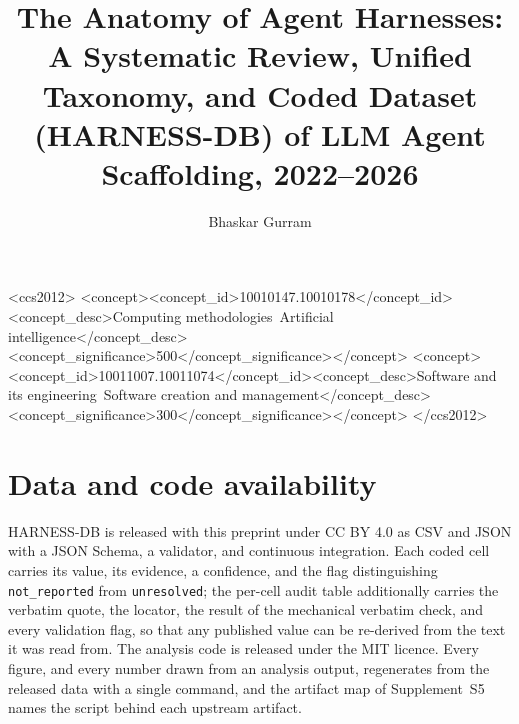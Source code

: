 \documentclass[manuscript,screen,review]{acmart}
\title{The Anatomy of Agent Harnesses: A Systematic Review, Unified Taxonomy, and Coded Dataset (HARNESS-DB) of LLM Agent Scaffolding, 2022--2026}
\author{Bhaskar Gurram}
\affiliation{%
  \institution{Independent researcher}
  \country{USA}}
\begin{document}
\begin{abstract}

\end{abstract}

\begin{CCSXML}
<ccs2012>
 <concept><concept_id>10010147.10010178</concept_id><concept_desc>Computing methodologies~Artificial intelligence</concept_desc><concept_significance>500</concept_significance></concept>
 <concept><concept_id>10011007.10011074</concept_id><concept_desc>Software and its engineering~Software creation and management</concept_desc><concept_significance>300</concept_significance></concept>
</ccs2012>
\end{CCSXML}

\maketitle












\section*{Data and code availability}

HARNESS-DB is released with this preprint under CC BY 4.0 as CSV and JSON with a JSON Schema, a validator, and continuous
integration. Each coded cell carries its value, its evidence, a confidence, and the flag distinguishing
\texttt{not\_reported} from \texttt{unresolved}; the per-cell audit table additionally carries the
verbatim quote, the locator, the result of the mechanical verbatim check, and every validation flag, so
that any published value can be re-derived from the text it was read from. The analysis code is released
under the MIT licence. Every figure, and every number drawn from an analysis output, regenerates from the
released data with a single command, and the artifact map of Supplement~S5 names the script behind each
upstream artifact.
\end{document}
